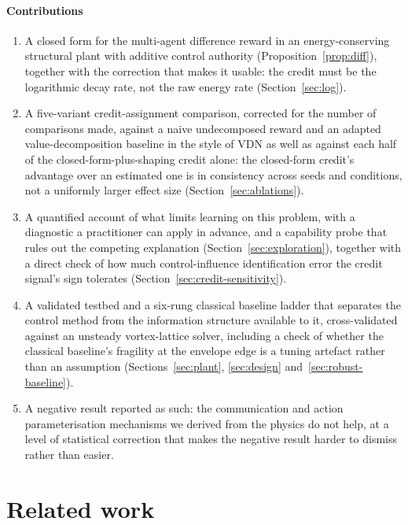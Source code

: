 \documentclass[preprint,11pt,authoryear]{elsarticle}
\begin{document}
\paragraph{Contributions}
\begin{enumerate}
\item A closed form for the multi-agent difference reward in an
energy-conserving structural plant with additive control authority
(Proposition~\ref{prop:diff}), together with the correction that makes it usable:
the credit must be the logarithmic decay rate, not the raw energy rate
(Section~\ref{sec:log}).
\item A five-variant credit-assignment comparison, corrected for the number of
comparisons made, against a naive undecomposed reward and an adapted
value-decomposition baseline in the style of VDN as well as against each half
of the closed-form-plus-shaping credit alone: the closed-form credit's
advantage over an estimated one is in consistency across seeds and conditions,
not a uniformly larger effect size (Section~\ref{sec:ablations}).
\item A quantified account of what limits learning on this problem, with a
diagnostic a practitioner can apply in advance, and a capability probe that rules
out the competing explanation (Section~\ref{sec:exploration}), together with a
direct check of how much control-influence identification error the credit
signal's sign tolerates (Section~\ref{sec:credit-sensitivity}).
\item A validated testbed and a six-rung classical baseline ladder that
separates the control method from the information structure available to it,
cross-validated against an unsteady vortex-lattice solver, including a check of
whether the classical baseline's fragility at the envelope edge is a tuning
artefact rather than an assumption (Sections~\ref{sec:plant},
\ref{sec:design} and~\ref{sec:robust-baseline}).
\item A negative result reported as such: the communication and action
parameterisation mechanisms we derived from the physics do not help, at a
level of statistical correction that makes the negative result harder to
dismiss rather than easier.
\end{enumerate}

\section{Related work}
\label{sec:related}
\end{document}
